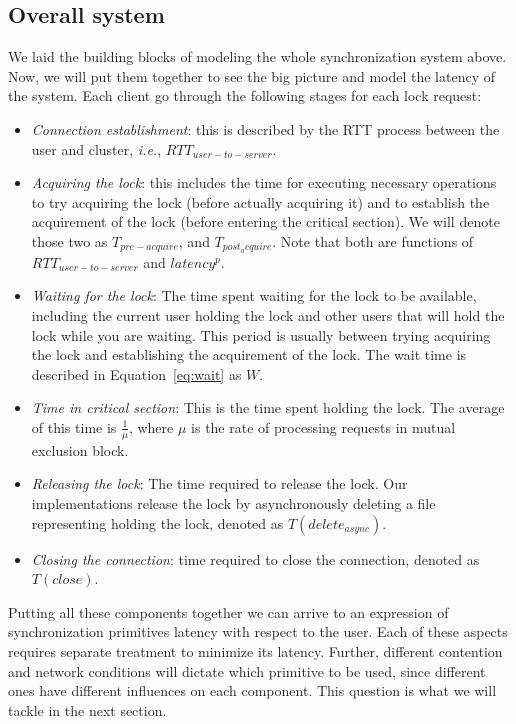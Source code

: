 \subsection{Overall system}
We laid the building blocks of modeling the whole synchronization system above. Now, we will put them together to see the big picture and model the latency of the system. Each client go through the following stages for each lock request:
\begin{itemize}
\item{\emph{Connection establishment}: this is described by the RTT process between the user and cluster, \emph{i.e.}, $RTT_{user-to-server}$.}
\item{\emph{Acquiring the lock}: this includes the time for executing necessary operations to try acquiring the lock (before actually acquiring it) and to establish the acquirement of the lock (before entering the critical section). We will denote those two as $T_{pre-acquire}$, and $T_{post_acquire}$. Note that both are functions of $RTT_{user-to-server}$ and $latency^p$.}
\item{\emph{Waiting for the lock}: The time spent waiting for the lock to be available, including the current user holding the lock and other users that will hold the lock while you are waiting. This period is usually between trying acquiring the lock and establishing the acquirement of the lock. The wait time is described in Equation~\ref{eq:wait} as $W$.}
\item{\emph{Time in critical section}: This is the time spent holding the lock. The average of this time is $\frac{1}{\mu}$, where $\mu$ is the rate of processing requests in mutual exclusion block.}
\item{\emph{Releasing the lock}: The time required to release the lock. Our implementations release the lock by asynchronously deleting a file representing holding the lock, denoted as $T(delete_{async})$. }
\item{\emph{Closing the connection}: time required to close the connection, denoted as $T(close)$. }
\end{itemize}
Putting all these components together we can arrive to an expression of synchronization primitives latency with respect to the user. Each of these aspects requires separate treatment to minimize its latency. Further, different contention and network conditions will dictate which primitive to be used, since different ones have different influences on each component. This question is what we will tackle in the next section.












